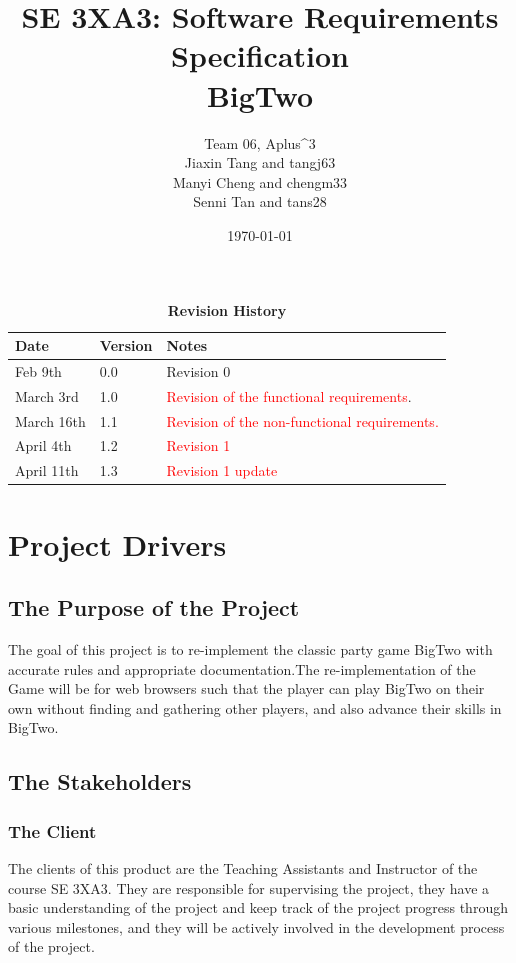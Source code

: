 \documentclass[12pt, titlepage]{article}
\title{SE 3XA3: Software Requirements Specification\\BigTwo}
\author{Team 06, Aplus^3
		\\ Jiaxin Tang and tangj63
		\\ Manyi Cheng and chengm33
		\\ Senni Tan and tans28
}
\date{\today}
\begin{document}
\maketitle

\tableofcontents
\listoftables
\listoffigures

\begin{table}[bp]
\caption{\bf Revision History}
\begin{tabularx}{\textwidth}{p{3cm}p{2cm}X}
\toprule {\bf Date} & {\bf Version} & {\bf Notes}\\
\midrule
Feb 9th & 0.0 & Revision 0\\
March 3rd & 1.0 & \textcolor{red}{Revision of the functional requirements}.\\
March 16th & 1.1 & \textcolor{red}{Revision of the non-functional requirements.}\\
April 4th & 1.2 & \textcolor{red}{Revision 1}\\
April 11th & 1.3 & \textcolor{red}{Revision 1 update}\\
\bottomrule
\end{tabularx}
\end{table}

\newpage


\section{Project Drivers}

\subsection{The Purpose of the Project}
The goal of this project is to re-implement the classic party game BigTwo with accurate rules and appropriate documentation.The re-implementation of the Game will be for web browsers such that the player can play BigTwo on their own without finding and gathering other players, and also advance their skills in BigTwo.

\subsection{The Stakeholders}

\subsubsection{The Client}
The clients of this product are the Teaching Assistants and Instructor of the course SE 3XA3. They are responsible for supervising the project, they have a basic understanding of the project and keep track of the project progress through various milestones, and they will be actively involved in the development process of the project.
\end{document}
